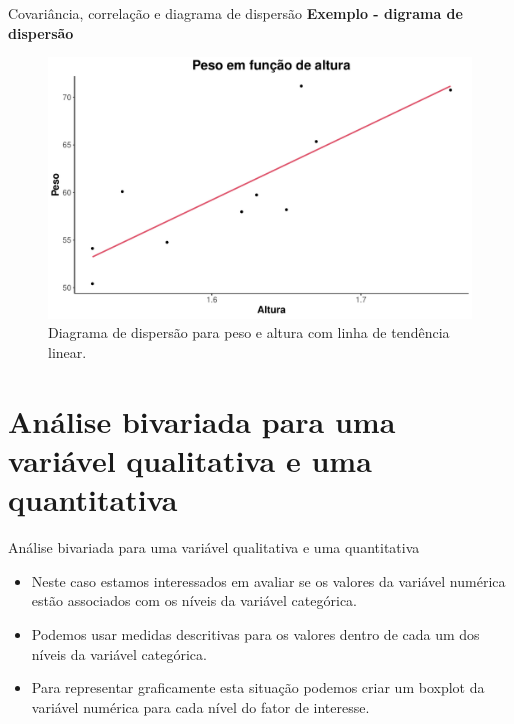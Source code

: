 \documentclass[
  ignorenonframetext,
  serif,
  professionalfont,
  usenames,
  dvipsnames,
  aspectratio = 169]{beamer}
\begin{document}
\begin{frame}{Covariância, correlação e diagrama de dispersão}
\protect\hypertarget{covariuxe2ncia-correlauxe7uxe3o-e-diagrama-de-dispersuxe3o-3}{}
\textbf{Exemplo - digrama de dispersão}

\begin{figure}

{\centering \includegraphics[width=0.65\linewidth]{202-exploratoria-bivariada_files/figure-beamer/unnamed-chunk-12-1} 

}

\caption{Diagrama de dispersão para peso e altura com linha de tendência linear.}\label{fig:unnamed-chunk-12}
\end{figure}
\end{frame}

\hypertarget{anuxe1lise-bivariada-para-uma-variuxe1vel-qualitativa-e-uma-quantitativa}{%
\section{Análise bivariada para uma variável qualitativa e uma
quantitativa}\label{anuxe1lise-bivariada-para-uma-variuxe1vel-qualitativa-e-uma-quantitativa}}

\begin{frame}{Análise bivariada para uma variável qualitativa e uma
quantitativa}
\protect\hypertarget{anuxe1lise-bivariada-para-uma-variuxe1vel-qualitativa-e-uma-quantitativa-1}{}
\begin{itemize}
\item
  Neste caso estamos interessados em avaliar se os valores da variável
  numérica estão associados com os níveis da variável categórica.
\item
  Podemos usar medidas descritivas para os valores dentro de cada um dos
  níveis da variável categórica.
\item
  Para representar graficamente esta situação podemos criar um boxplot
  da variável numérica para cada nível do fator de interesse.
\end{itemize}
\end{frame}
\end{document}
